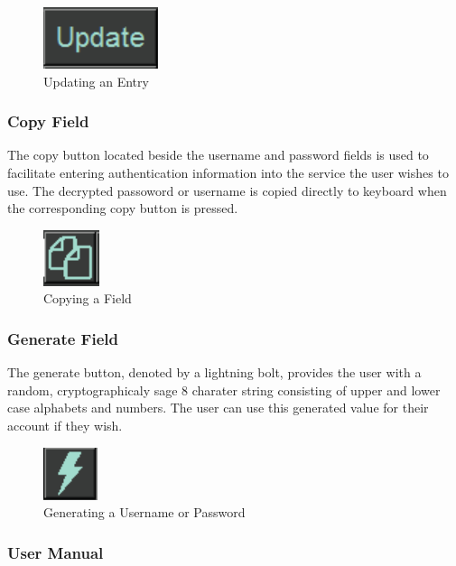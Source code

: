 \documentclass[12pt, titlepage]{article}
\begin{document}
\begin{figure}[h]
	\centering
	\includegraphics[scale=1.0]{images/Update.PNG}
	\caption{Updating an Entry}
	\label{fig:UpEnt}
\end{figure}

\subsubsection{Copy Field} \label{CopyField}

The copy button located beside the username and password fields is used to facilitate entering authentication information into the service the user wishes to use. The decrypted passoword or username is copied directly to keyboard when the corresponding copy button is pressed.

\begin{figure}[h]
	\centering
	\includegraphics[scale=1.0]{images/Copy.PNG}
	\caption{Copying a Field}
	\label{fig:CopF}
\end{figure}

\subsubsection{Generate Field} \label{GenField}

The generate button, denoted by a lightning bolt, provides the user with a random, cryptographicaly sage 8 charater string consisting of upper and lower case alphabets and numbers. The user can use this generated value for their account if they wish.

\begin{figure}[h]
	\centering
	\includegraphics[scale=1.0]{images/Generate.PNG}
	\caption{Generating a Username or Password}
	\label{fig:genPass}
\end{figure}

\subsubsection{User Manual} \label{UseMan}
\end{document}
